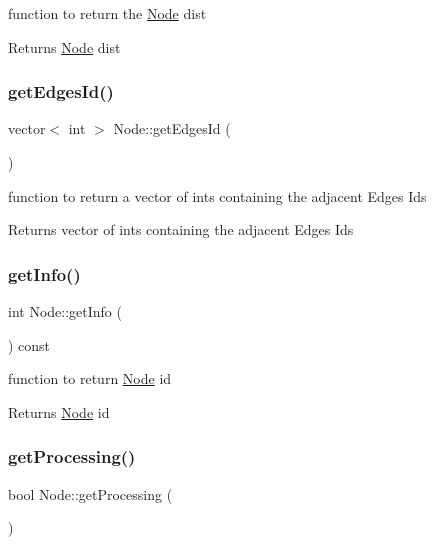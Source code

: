 function to return the \hyperlink{class_node}{Node} dist 

\begin{DoxyReturn}{Returns}
\hyperlink{class_node}{Node} dist 
\end{DoxyReturn}
\mbox{\label{class_node_a9aadeebc828eedfaf8b2a9c2e6fb9e15}} 
\subsubsection{\texorpdfstring{get\+Edges\+Id()}{getEdgesId()}}
{\footnotesize\ttfamily vector$<$ int $>$ Node\+::get\+Edges\+Id (\begin{DoxyParamCaption}{ }\end{DoxyParamCaption})}



function to return a vector of ints containing the adjacent Edges\textquotesingle{} Ids 

\begin{DoxyReturn}{Returns}
vector of ints containing the adjacent Edges\textquotesingle{} Ids 
\end{DoxyReturn}
\mbox{\label{class_node_a07008db4cafcc0f3df7746992d22bbd3}} 
\subsubsection{\texorpdfstring{get\+Info()}{getInfo()}}
{\footnotesize\ttfamily int Node\+::get\+Info (\begin{DoxyParamCaption}{ }\end{DoxyParamCaption}) const}



function to return \hyperlink{class_node}{Node} id 

\begin{DoxyReturn}{Returns}
\hyperlink{class_node}{Node} id 
\end{DoxyReturn}
\mbox{\label{class_node_a411b7225b6f0b1a7d0ffe02196dedb86}} 
\subsubsection{\texorpdfstring{get\+Processing()}{getProcessing()}}
{\footnotesize\ttfamily bool Node\+::get\+Processing (\begin{DoxyParamCaption}{ }\end{DoxyParamCaption})}



